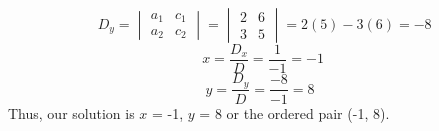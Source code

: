 \documentclass{article}
\begin{document}
\begin{flushleft}
\[ \ \ \ D_y = \begin{vmatrix}a_{1} & c_{1} \\ a_{2} & c_{2}\end{vmatrix} = \begin{vmatrix}2 & 6 \\ 3 & 5\end{vmatrix} = 2(5) - 3(6) = -8\]
\linebreak
\[ \ \ x = \frac{D_x}{D} = \frac{1}{-1} = -1\]
\linebreak
\[y = \frac{D_y}{D} = \frac{-8}{-1} = 8\]
\linebreak
Thus, our solution is $x$ = -1, $y$ = 8 or the ordered pair (-1, 8).     
\end{flushleft}
\end{document}
